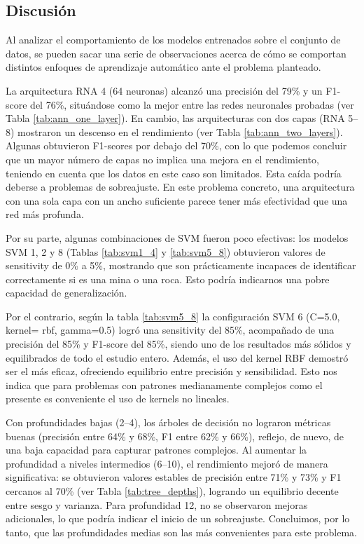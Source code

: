 \documentclass[a4paper,10pt]{article}
\begin{document}
    \subsection*{Discusión}
    Al analizar el comportamiento de los modelos entrenados sobre el conjunto de datos, se pueden sacar una serie de observaciones acerca de cómo se comportan distintos enfoques de aprendizaje automático ante el problema planteado. 
    
    La arquitectura RNA 4 (64 neuronas) alcanzó una precisión del 79\% y un F1-score del 76\%, situándose como la mejor entre las redes neuronales probadas (ver Tabla \ref{tab:ann_one_layer}). En cambio, las arquitecturas con dos capas (RNA 5–8) mostraron un descenso en el rendimiento (ver Tabla \ref{tab:ann_two_layers}). Algunas obtuvieron F1-scores por debajo del 70\%, con lo que podemos concluir que un mayor número de capas no implica una mejora en el rendimiento, teniendo en cuenta que los datos en este caso son limitados. Esta caída podría deberse a problemas de sobreajuste. En este problema concreto, una arquitectura con una sola capa con un ancho suficiente parece tener más efectividad que una red más profunda.
    
    Por su parte, algunas combinaciones de SVM fueron poco efectivas: los modelos SVM 1, 2 y 8 (Tablas \ref{tab:svm1_4} y \ref{tab:svm5_8}) obtuvieron valores de sensitivity de 0\% a 5\%, mostrando que son prácticamente incapaces de identificar correctamente si es una mina o una roca. Esto podría indicarnos una pobre capacidad de generalización. 

    Por el contrario, según la tabla \ref{tab:svm5_8} la configuración SVM 6 (C=5.0, kernel= rbf, gamma=0.5) logró una sensitivity del 85\%, acompañado de una precisión del 85\% y F1-score del 85\%, siendo uno de los resultados más sólidos y equilibrados de todo el estudio entero. Además, el uso del kernel RBF demostró ser el más eficaz, ofreciendo equilibrio entre precisión y sensibilidad. Esto nos indica que para problemas con patrones medianamente complejos como el presente es conveniente el uso de kernels no lineales.
    
    Con profundidades bajas (2–4), los árboles de decisión no lograron métricas buenas (precisión entre 64\% y 68\%, F1 entre 62\% y 66\%), reflejo, de nuevo, de una baja capacidad para capturar patrones complejos. Al aumentar la profundidad a niveles intermedios (6–10), el rendimiento mejoró de manera significativa: se obtuvieron valores estables de precisión entre 71\% y 73\% y F1 cercanos al 70\% (ver Tabla \ref{tab:tree_depths}), logrando un equilibrio decente entre sesgo y varianza. Para profundidad 12, no se observaron mejoras adicionales, lo que podría indicar el inicio de un sobreajuste. Concluimos, por lo tanto, que las profundidades medias son las más convenientes para este problema.
    
\end{document}
